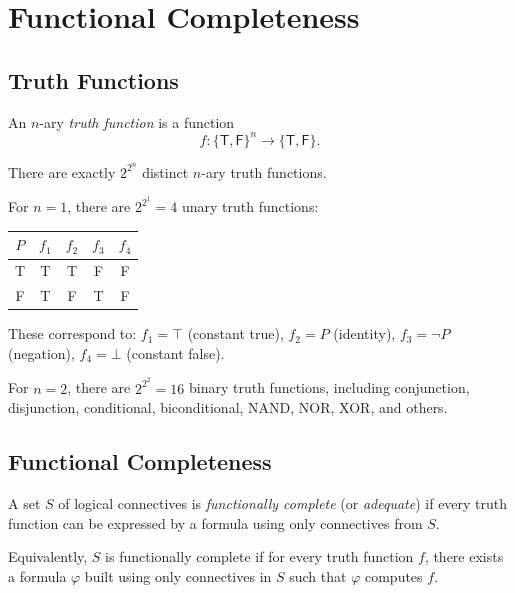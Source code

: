 
\section{Functional Completeness}

\subsection{Truth Functions}

\begin{definition}
An $n$-ary \emph{truth function} is a function
\[
f : \{\mathsf{T}, \mathsf{F}\}^n \to \{\mathsf{T}, \mathsf{F}\}.
\]

There are exactly $2^{2^n}$ distinct $n$-ary truth functions.
\end{definition}

\begin{example}
For $n = 1$, there are $2^{2^1} = 4$ unary truth functions:
\begin{center}
\renewcommand{\arraystretch}{1.2}
\begin{tabular}{|c||c|c|c|c|}
\hline
$P$ & $f_1$ & $f_2$ & $f_3$ & $f_4$ \\
\hline
T & T & T & F & F \\
F & T & F & T & F \\
\hline
\end{tabular}
\end{center}
These correspond to: $f_1 = \top$ (constant true), $f_2 = P$ (identity),
$f_3 = \neg P$ (negation), $f_4 = \bot$ (constant false).
\end{example}

\begin{example}
For $n = 2$, there are $2^{2^2} = 16$ binary truth functions, including
conjunction, disjunction, conditional, biconditional, NAND, NOR, XOR, and others.
\end{example}

\subsection{Functional Completeness}

\begin{definition}
A set $S$ of logical connectives is \emph{functionally complete} (or
\emph{adequate}) if every truth function can be expressed by a formula using
only connectives from $S$.

Equivalently, $S$ is functionally complete if for every truth function $f$,
there exists a formula $\varphi$ built using only connectives in $S$ such that
$\varphi$ computes $f$.
\end{definition}

